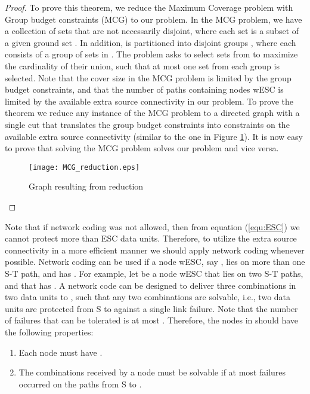 \documentclass[conference]{IEEEtran}
\newcommand{\refeq}[1]{(\ref{#1})}
\begin{document}
\begin{proof}
To prove this theorem, we reduce the Maximum Coverage problem with Group budget constraints (MCG) \cite{CA04} to our problem. In the MCG problem, we have a collection of sets  that are not necessarily disjoint, where each set is a subset of a given ground set . In addition,  is partitioned into disjoint groups , where each  consists of a group of sets in . The problem asks to select  sets from  to maximize the cardinality of their union, such that at most one set from each group is selected. Note that the cover size in the MCG problem is limited by the group budget constraints, and that the number of paths containing nodes wESC is limited by the available extra source connectivity in our problem. To prove the theorem we reduce any instance of the MCG problem to a directed graph with a single cut that translates the group budget constraints into constraints on the available extra source connectivity (similar to the one in Figure \ref{MCG_reduction}). It is now easy to prove that solving the MCG problem solves our problem and vice versa.  

\begin{figure}[tbh]
\centering
\texttt{[image: MCG\_reduction.eps]}
\caption{Graph resulting from reduction}
\label{MCG_reduction}
\end{figure}

\end{proof}



Note that if network coding was not allowed, then from equation \refeq{equ:ESC} we cannot protect more than ESC data units. Therefore, to utilize the extra source connectivity in a more efficient manner we should apply network coding whenever possible. Network coding can be used if a node wESC, say , lies on more than one S-T path, and has . For example, let  be a node wESC that lies on two S-T paths, and that has . A network code can be designed to deliver three combinations in two data units to , such that any two combinations are solvable, i.e., two data units are protected from S to  against a single link failure. Note that the number of failures that can be tolerated is at most . Therefore, the nodes in  should have the following properties:

\begin{enumerate}
\item Each node  must have . 
\item The combinations received by a node  must be solvable if at most  failures occurred on the  paths from S to .
\end{enumerate}
\end{document}
